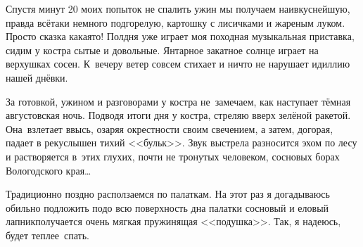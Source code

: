 Спустя минут 20 моих попыток не спалить ужин мы получаем наивкуснейшую, правда всё\sdash таки немного подгорелую, картошку с лисичками и жареным луком.  Просто сказка какая\sdash то! Полдня уже играет моя походная музыкальная приставка, сидим у костра сытые и довольные. Янтарное закатное солнце играет на верхушках сосен. К~вечеру ветер совсем стихает и ничто не нарушает идиллию нашей днёвки.

За готовкой, ужином и разговорами у костра не~замечаем, как наступает тёмная августовская ночь. Подводя итоги дня у костра, стреляю вверх зелёной ракетой. Она~взлетает ввысь, озаряя окрестности своим свечением, а затем, догорая, падает в реку\mdash слышен тихий <<бульк>>. Звук выстрела разносится эхом по лесу и растворяется в~этих глухих, почти не тронутых человеком, сосновых борах Вологодского края\ldots~

Традиционно поздно расползаемся по палаткам. На этот раз я догадываюсь обильно подложить подо всю поверхность дна палатки сосновый и еловый лапник\mdash получается очень мягкая пружинящая <<подушка>>. Так, я надеюсь, будет теплее~спать. 

\begin{center}
\end{center}